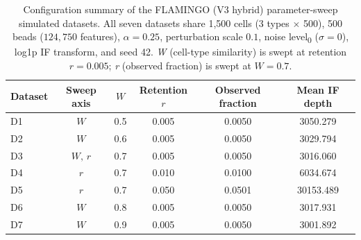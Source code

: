 \begin{table}[t]
\centering
\caption{Configuration summary of the FLAMINGO (V3 hybrid) parameter-sweep simulated datasets. All seven datasets share 1,500 cells (3 types $\times$ 500), 500 beads ($124{,}750$ features), $\alpha=0.25$, perturbation scale $0.1$, noise level\textsubscript{0} ($\sigma=0$), log1p IF transform, and seed 42. \emph{W} (cell-type similarity) is swept at retention $r=0.005$; \emph{r} (observed fraction) is swept at $W=0.7$.}
\label{tab:flamingo_paramsweep}
    \begin{tabular}{lccccc}
    \toprule
    Dataset & Sweep axis & $W$ & Retention $r$ & Observed fraction & Mean IF depth \\
    \midrule
    D1 & $W$       & 0.5 & 0.005 & 0.0050 & 3050.279 \\
    D2 & $W$       & 0.6 & 0.005 & 0.0050 & 3029.794 \\
    D3 & $W,\,r$   & 0.7 & 0.005 & 0.0050 & 3016.060 \\
    D4 & $r$       & 0.7 & 0.010 & 0.0100 & 6034.674 \\
    D5 & $r$       & 0.7 & 0.050 & 0.0501 & 30153.489 \\
    D6 & $W$       & 0.8 & 0.005 & 0.0050 & 3017.931 \\
    D7 & $W$       & 0.9 & 0.005 & 0.0050 & 3001.892 \\
    \bottomrule
    \end{tabular}
\end{table}
